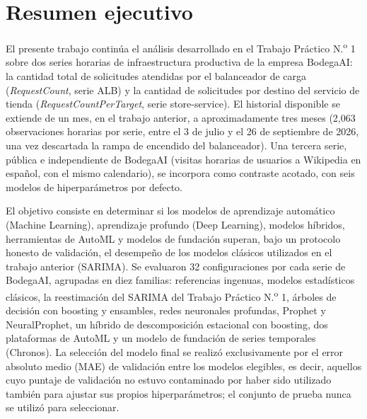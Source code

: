 \section*{Resumen ejecutivo}

El presente trabajo continúa el análisis desarrollado en el Trabajo Práctico N.\textsuperscript{o} 1
sobre dos series horarias de infraestructura productiva de la empresa BodegaAI: la cantidad total
de solicitudes atendidas por el balanceador de carga (\emph{RequestCount}, serie ALB) y la cantidad de
solicitudes por destino del servicio de tienda (\emph{RequestCountPerTarget}, serie store-service). El
historial disponible se extiende de un mes, en el trabajo anterior, a aproximadamente tres meses
(2,063 observaciones horarias por serie, entre el 3 de julio y el 26 de septiembre de 2026, una vez
descartada la rampa de encendido del balanceador). Una tercera serie, pública e independiente de
BodegaAI (visitas horarias de usuarios a Wikipedia en español, con el mismo calendario), se incorpora como
contraste acotado, con seis modelos de hiperparámetros por defecto.

El objetivo consiste en determinar si los modelos de aprendizaje automático (Machine Learning),
aprendizaje profundo (Deep Learning), modelos híbridos, herramientas de AutoML y modelos de fundación
superan, bajo un protocolo honesto de validación, el desempeño de los modelos clásicos utilizados en el
trabajo anterior (SARIMA). Se evaluaron 32 configuraciones por cada serie de BodegaAI, agrupadas en diez familias:
referencias ingenuas, modelos estadísticos clásicos, la reestimación del SARIMA del Trabajo Práctico N.\textsuperscript{o} 1,
árboles de decisión con boosting y ensambles, redes neuronales profundas, Prophet y NeuralProphet, un
híbrido de descomposición estacional con boosting, dos plataformas de AutoML y un modelo de fundación
de series temporales (Chronos). La selección del modelo final se realizó exclusivamente por el error
absoluto medio (MAE) de validación entre los modelos elegibles, es decir, aquellos cuyo puntaje de
validación no estuvo contaminado por haber sido utilizado también para ajustar sus propios
hiperparámetros; el conjunto de prueba nunca se utilizó para seleccionar.

